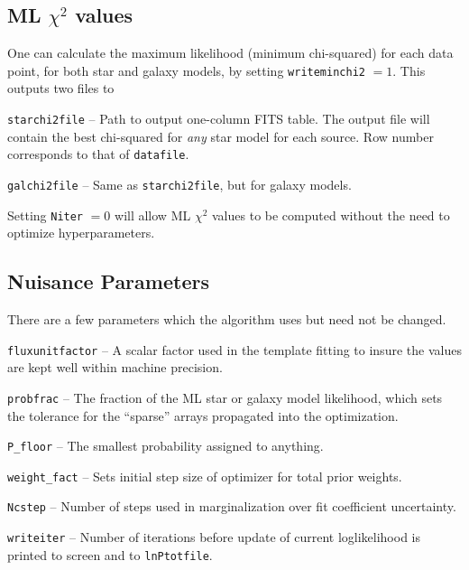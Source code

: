 \documentclass[12pt,preprint]{aastex}
\begin{document}
\subsection{ML $\chi^2$ values}

One can calculate the maximum likelihood (minimum chi-squared) for each data 
point, for both star and galaxy models, by setting {\tt writeminchi2} $=1$.  This outputs
two files to

{\tt starchi2file} -- Path to output one-column FITS table.  The output file will contain 
the best chi-squared for \emph{any} star model for each source.  Row number 
corresponds to that of {\tt datafile}.

{\tt galchi2file} -- Same as {\tt starchi2file}, but for galaxy models.

Setting {\tt Niter} $=0$ will allow ML $\chi^2$ values to be computed without the need 
to optimize hyperparameters.

\subsection{Nuisance Parameters}

There are a few parameters which the algorithm uses but need not be changed.

{\tt fluxunitfactor} -- A scalar factor used in the template fitting to insure the values are 
kept well within machine precision. 

{\tt probfrac} -- The fraction of the ML star or galaxy model likelihood, which sets the 
tolerance for the ``sparse'' arrays propagated into the optimization.

{\tt P\_floor} -- The smallest probability assigned to anything.

{\tt weight\_fact} -- Sets initial step size of optimizer for total prior weights.

{\tt Ncstep} --  Number of steps used in marginalization over fit coefficient uncertainty.

{\tt writeiter} -- Number of iterations before update of current loglikelihood is printed 
to screen and to {\tt lnPtotfile}.
\end{document}
